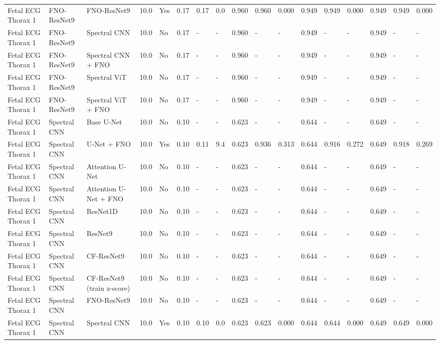 \begin{longtable}{lllllllllllllllll}
Fetal ECG Thorax 1 & FNO-ResNet9 & FNO-ResNet9 & 10.0 & Yes & 0.17 & 0.17 & 0.0 & 0.960 & 0.960 & 0.000 & 0.949 & 0.949 & 0.000 & 0.949 & 0.949 & 0.000 \\
Fetal ECG Thorax 1 & FNO-ResNet9 & Spectral CNN & 10.0 & No & 0.17 & - & - & 0.960 & - & - & 0.949 & - & - & 0.949 & - & - \\
Fetal ECG Thorax 1 & FNO-ResNet9 & Spectral CNN + FNO & 10.0 & No & 0.17 & - & - & 0.960 & - & - & 0.949 & - & - & 0.949 & - & - \\
Fetal ECG Thorax 1 & FNO-ResNet9 & Spectral ViT & 10.0 & No & 0.17 & - & - & 0.960 & - & - & 0.949 & - & - & 0.949 & - & - \\
Fetal ECG Thorax 1 & FNO-ResNet9 & Spectral ViT + FNO & 10.0 & No & 0.17 & - & - & 0.960 & - & - & 0.949 & - & - & 0.949 & - & - \\
Fetal ECG Thorax 1 & Spectral CNN & Base U-Net & 10.0 & No & 0.10 & - & - & 0.623 & - & - & 0.644 & - & - & 0.649 & - & - \\
Fetal ECG Thorax 1 & Spectral CNN & U-Net + FNO & 10.0 & Yes & 0.10 & 0.11 & 9.4 & 0.623 & 0.936 & 0.313 & 0.644 & 0.916 & 0.272 & 0.649 & 0.918 & 0.269 \\
Fetal ECG Thorax 1 & Spectral CNN & Attention U-Net & 10.0 & No & 0.10 & - & - & 0.623 & - & - & 0.644 & - & - & 0.649 & - & - \\
Fetal ECG Thorax 1 & Spectral CNN & Attention U-Net + FNO & 10.0 & No & 0.10 & - & - & 0.623 & - & - & 0.644 & - & - & 0.649 & - & - \\
Fetal ECG Thorax 1 & Spectral CNN & ResNet1D & 10.0 & No & 0.10 & - & - & 0.623 & - & - & 0.644 & - & - & 0.649 & - & - \\
Fetal ECG Thorax 1 & Spectral CNN & ResNet9 & 10.0 & No & 0.10 & - & - & 0.623 & - & - & 0.644 & - & - & 0.649 & - & - \\
Fetal ECG Thorax 1 & Spectral CNN & CF-ResNet9 & 10.0 & No & 0.10 & - & - & 0.623 & - & - & 0.644 & - & - & 0.649 & - & - \\
Fetal ECG Thorax 1 & Spectral CNN & CF-ResNet9 (train z-score) & 10.0 & No & 0.10 & - & - & 0.623 & - & - & 0.644 & - & - & 0.649 & - & - \\
Fetal ECG Thorax 1 & Spectral CNN & FNO-ResNet9 & 10.0 & No & 0.10 & - & - & 0.623 & - & - & 0.644 & - & - & 0.649 & - & - \\
Fetal ECG Thorax 1 & Spectral CNN & Spectral CNN & 10.0 & Yes & 0.10 & 0.10 & 0.0 & 0.623 & 0.623 & 0.000 & 0.644 & 0.644 & 0.000 & 0.649 & 0.649 & 0.000 \\

\end{longtable}

